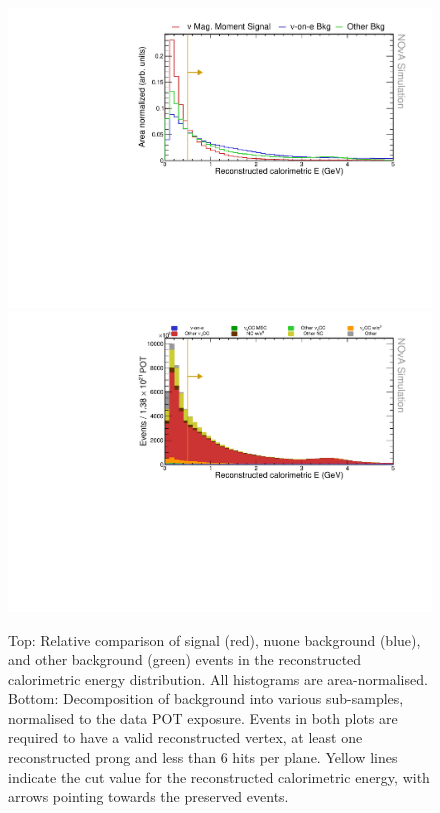 \begin{figure}[hbtp]
\centering
\includegraphics[width=.9\textwidth]{Plots/NuMMEventSelection/N1Cut_calELow.pdf}
\includegraphics[width=.9\textwidth]{Plots/NuMMEventSelection/N1Cut_calELow_BkgDecomp.pdf}
\caption[Low calorimetric energy cut for reconstruction quality]{Top: Relative comparison of signal (red), \acrshort{nuone} background (blue), and other background (green) events in the reconstructed calorimetric energy distribution. All histograms are area-normalised. Bottom: Decomposition of background into various sub-samples, normalised to the data \acrshort{POT} exposure. Events in both plots are required to have a valid reconstructed vertex, at least one reconstructed prong and less than $6$ hits per plane. Yellow lines indicate the cut value for the reconstructed calorimetric energy, with arrows pointing towards the preserved events.}
\label{fig:NuMMCutsLowCalE}
\end{figure}

